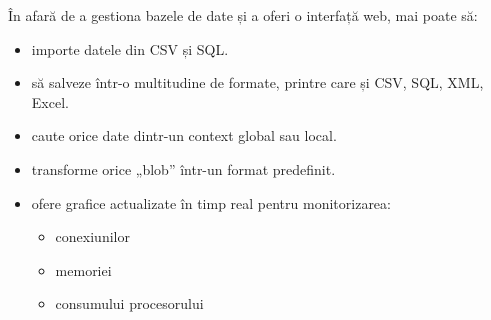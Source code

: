 	În afară de a gestiona bazele de date și a oferi o interfață web, mai poate să:
	\begin{itemize}
		\item importe datele din CSV și SQL.
		\item să salveze într-o multitudine de formate, printre care și CSV, SQL, XML, Excel.
		\item caute orice date dintr-un context global sau local.
		\item transforme orice „blob” într-un format predefinit.
		\item ofere grafice actualizate în timp real pentru monitorizarea:
			\begin{itemize}
				\item conexiunilor
				\item memoriei
				\item consumului procesorului
			\end{itemize}
	\end{itemize}
